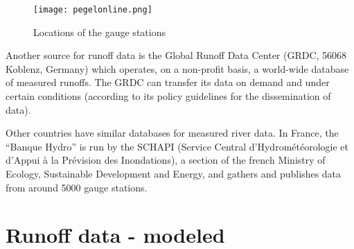 \begin{figure}[H]
\centering
\texttt{[image: pegelonline.png]}
\caption[Locations of the gauge stations]{Locations of the gauge stations \cite{pegelonline}}
\label{pegelonline}
\end{figure}

Another source for runoff data is the Global Runoff Data Center (GRDC, 56068 Koblenz, Germany) which operates, on a non-profit basis, a world-wide database of measured runoffs. The GRDC can transfer its data on demand and under certain conditions (according to its policy guidelines for the dissemination of data).\newline

Other countries have similar databases for measured river data. In France, the ``Banque Hydro'' is run by the SCHAPI (Service Central d'Hydrométéorologie et d'Appui à la Prévision des Inondations), a section of the french Ministry of Ecology, Sustainable Development and Energy, and gathers and publishes data from around 5000 gauge stations.

\section{Runoff data - modeled}


